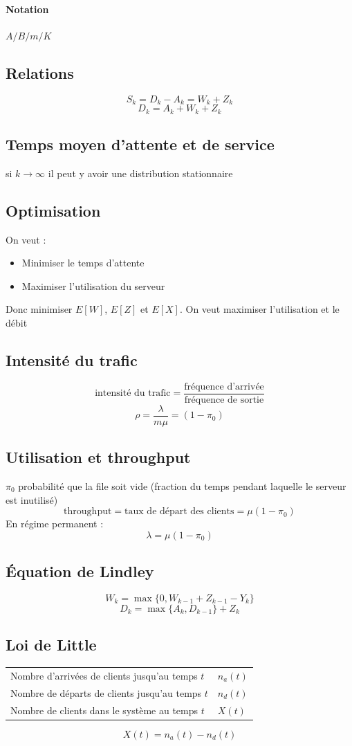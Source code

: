 \documentclass[resume]{subfiles}
\begin{document}
\paragraph{Notation} $A/B/m/K$
\subsection{Relations}
$$S_k=D_k-A_k=W_k+Z_k$$
$$D_k=A_k+W_k+Z_k$$
\subsection{Temps moyen d'attente et de service}
si $k\to\infty$ il peut y avoir une distribution stationnaire
\subsection{Optimisation}
On veut :
\begin{itemize}
\item Minimiser le temps d'attente
\item Maximiser l'utilisation du serveur
\end{itemize}
Donc minimiser $E[W]$, $E[Z]$ et $E[X]$. On veut maximiser l'utilisation et le débit
\subsection{Intensité du trafic}
$$\text{intensité du trafic} = \frac{\text{fréquence d'arrivée}}{\text{fréquence de sortie}}$$
$$\rho=\frac{\lambda}{m\mu}=(1-\pi_0)$$
\subsection{Utilisation et throughput}
$\pi_0$ probabilité que la file soit vide (fraction du temps pendant laquelle le serveur est inutilisé)
$$\text{throughput} = \text{taux de départ des clients} = \mu(1-\pi_0)$$
En régime permanent :
$$\lambda=\mu(1-\pi_0)$$
\subsection{Équation de Lindley}
$$W_k=\max\lbrace 0,W_{k-1}+Z_{k-1}-Y_k\rbrace$$
$$D_k=\max\lbrace A_k,D_{k-1}\rbrace +Z_k$$
\subsection{Loi de Little}
\begin{center}
\begin{tabular}{p{5cm}l}
Nombre d'arrivées de clients jusqu'au temps $t$ & $n_a(t)$\\
Nombre de départs de clients jusqu'au temps $t$ & $n_d(t)$\\
Nombre de clients dans le système au temps $t$ & $X(t)$\\
\end{tabular}
\end{center}
$$X(t)=n_a(t)-n_d(t)$$
\end{document}
